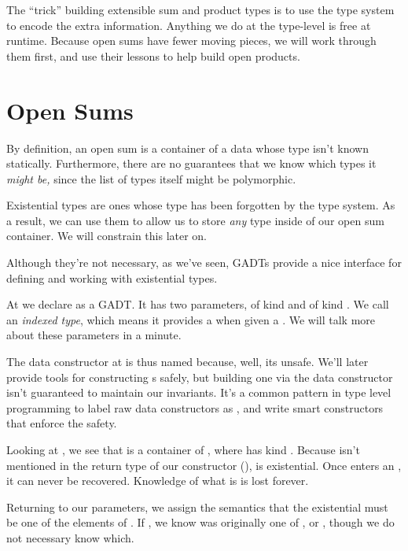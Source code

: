 \documentclass[book.tex]{subfiles}
\begin{document}
The ``trick'' building extensible sum and product types is to use the
type system to encode the extra information. Anything we do at the type-level is
free at runtime. Because open sums have fewer moving pieces, we will work
through them first, and use their lessons to help build open products.


\section{Open Sums}


By definition, an open sum is a container of a data whose type isn't known
statically. Furthermore, there are no guarantees that we know which types it
\emph{might be,} since the list of types itself might be polymorphic.

Existential types are ones whose type has been forgotten by the type system. As a
result, we can use them to allow us to store \emph{any} type inside of our open
sum container. We will constrain this later on.

Although they're not necessary, as we've seen, GADTs provide a nice interface
for defining and working with existential types.


At  we declare  as a GADT. It has two parameters, 
of kind  and  of kind \kind{[k]}. We call  an
\emph{indexed type}, which means it provides a  when given a
. We will talk more about these parameters in a minute.

The data constructor  at  is thus named because, well,
its unsafe. We'll later provide tools for constructing s safely, but
building one via the data constructor isn't guaranteed to maintain our
invariants. It's a common pattern in type level programming to label raw data
constructors as , and write smart constructors that enforce the
safety.

Looking at , we see that  is a container of , where
 has kind . Because  isn't mentioned in the return type of
our constructor (),  is existential. Once  enters an
, it can never be recovered. Knowledge of what  is is lost
forever.

Returning to our parameters, we assign the semantics that the existential 
must be one of the elements of . If ,
we know  was originally one of ,  or , though
we do not necessary know which.
\end{document}
